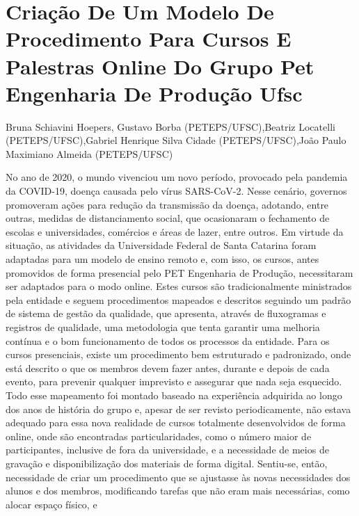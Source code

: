 


\section*{Criação De Um Modelo De Procedimento Para Cursos E Palestras Online Do Grupo Pet Engenharia De Produção Ufsc}

Bruna Schiavini Hoepers, Gustavo Borba (PETEPS/UFSC),Beatriz Locatelli (PETEPS/UFSC),Gabriel Henrique Silva Cidade (PETEPS/UFSC),João Paulo Maximiano Almeida (PETEPS/UFSC)

No ano de 2020, o mundo vivenciou um novo período, provocado pela pandemia da COVID-19, 
doença causada pelo vírus SARS-CoV-2. Nesse cenário, governos promoveram ações para 
redução da transmissão da doença, adotando, entre outras, medidas de distanciamento social, que 
ocasionaram o fechamento de escolas e universidades, comércios e áreas de lazer, entre outros. 
Em virtude da situação, as atividades da Universidade Federal de Santa Catarina foram adaptadas 
para um modelo de ensino remoto e, com isso, os cursos, antes promovidos de forma presencial 
pelo PET Engenharia de Produção, necessitaram ser adaptados para o modo online.
Estes cursos são tradicionalmente ministrados pela entidade e seguem procedimentos mapeados e 
descritos seguindo um padrão de sistema de gestão da qualidade, que apresenta, através de 
fluxogramas e registros de qualidade, uma metodologia que tenta garantir uma melhoria contínua 
e o bom funcionamento de todos os processos da entidade. Para os cursos presenciais, existe um 
procedimento bem estruturado e padronizado, onde está descrito o que os membros devem fazer 
antes, durante e depois de cada evento, para prevenir qualquer imprevisto e assegurar que nada 
seja esquecido. Todo esse mapeamento foi montado baseado na experiência adquirida ao longo 
dos anos de história do grupo e, apesar de ser revisto periodicamente, não estava adequado para 
essa nova realidade de cursos totalmente desenvolvidos de forma online, onde são encontradas 
particularidades, como o número maior de participantes, inclusive de fora da universidade, e a 
necessidade de meios de gravação e disponibilização dos materiais de forma digital. Sentiu-se, 
então, necessidade de criar um procedimento que se ajustasse às novas necessidades dos alunos e 
dos membros, modificando tarefas que não eram mais necessárias, como alocar espaço físico, e 
